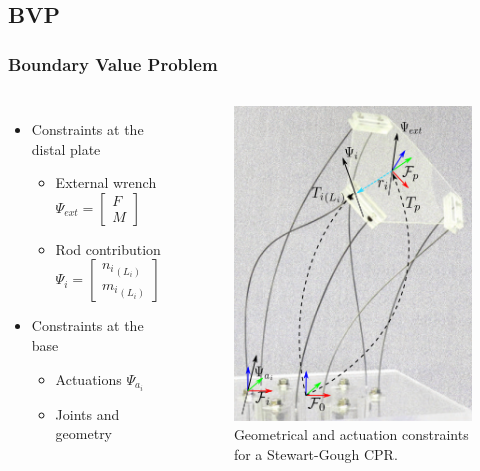 \documentclass[compress]{thesisbeamer}
\begin{document}
        \subsection{BVP}
        \begin{frame}
        	\frametitle{Boundary Value Problem}
			\begin{columns}
			\begin{itemize}%
  				\item Constraints at the distal plate
  				\begin{itemize}%
   					\item External wrench $ \Psi_{ext} = \begin{bmatrix} F \\ M \end{bmatrix}   					 $
   					\item Rod contribution $ \Psi_{i} = \begin{bmatrix} {n_i}_{(L_i)} \\ {m_i}_{(L_i)} \end{bmatrix}   					 $
  				\end{itemize}
  				\item Constraints at the base 
  				\begin{itemize}%
   					\item Actuations $ \Psi_{a_i}$
   					\item Joints and geometry 
  				\end{itemize}
 			\end{itemize}
			\vspace{2cm}
			\begin{figure}[h]
				\centering
				\includegraphics[height=0.7\textheight]{images/BVP}
				\caption{Geometrical and actuation constraints for a Stewart-Gough CPR.}
			\end{figure}
			\end{columns}
		\end{frame}
	
\end{document}
